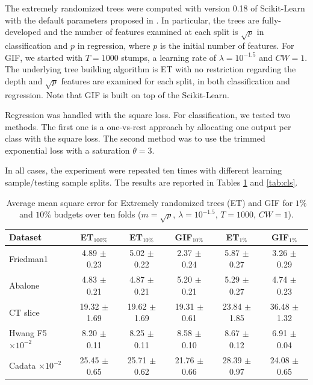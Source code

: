 \documentclass{article}
\newcommand{\bestA}{\cellcolor{orange}}
\newcommand{\bestB}{\cellcolor{dodgerblue}}
\begin{document}
The extremely randomized trees were computed with version 0.18 of Scikit-Learn 
\cite{scikit} with the default parameters proposed in \cite{extratrees}. In 
particular, the trees are fully-developed and the number of features examined 
at each split is $\sqrt{p}$ in classification and $p$ in regression, where $p$ 
is the initial number of features. 
For GIF, we started with $T=1000$ stumps, a learning rate of $\lambda = 
10^{-1.5}$ and $CW=1$. The underlying tree building algorithm is ET with no 
restriction regarding the depth and $\sqrt{p}$ features are examined for each 
split, in both classification and regression.
Note that GIF is built on top of the Scikit-Learn.

Regression was handled with the square loss.
For classification, we tested two methods. The first one is a one-vs-rest 
approach by allocating one output per class with the square loss. The second 
method was to use the trimmed exponential loss with a saturation $\theta = 3$. 

In all cases, the experiment were repeated ten times with different learning 
sample/testing sample splits. The results are reported in Tables \ref{tab:reg} 
and \ref{tab:cls}.

  
\begin{table}[t]
\caption{Average mean square error for Extremely randomized trees (ET) and GIF 
for $1\%$ and $10\%$ budgets over ten folds ($m=\sqrt{p}$, $\lambda=10^{-1.5}$, 
$T=1000$, $CW=1$).}
\label{tab:reg}
\begin{center}
\begin{small}
\begin{sc}
\begin{tabular}{l|c|cc|cc}
\hline
Dataset & ET$_{100\%}$ & ET$_{10\%}$ & GIF$_{10\%}$ & ET$_{1\%}$ & GIF$_{1\%}$\\
\hline
Friedman1 & 4.89 $\pm$ 0.23 & 5.02 $\pm$ 0.22 & \bestA 2.37 $\pm$ 0.24 & 5.87 
$\pm$ 0.27 & \bestB 3.26 $\pm$ 0.29 \\
Abalone & 4.83 $\pm$ 0.21 & \bestA 4.87 $\pm$ 0.21 & 5.20 $\pm$ 0.21 & 5.29 
$\pm$ 0.27 & \bestB 4.74 $\pm$ 0.23 \\
CT slice & 19.32 $\pm$ 1.69 & 19.62 $\pm$ 1.69 & \bestA 19.31 $\pm$ 0.61 & 
\bestB 23.84 $\pm$ 1.85 & 36.48 $\pm$ 1.32 \\
Hwang F5 \hfill {\tiny $\times 10^{-2}$} & 8.20 $\pm$ 0.11 & \bestA 8.25 $\pm$ 
0.11 & 8.58 $\pm$ 0.10 & 8.67 $\pm$ 0.12 & \bestB 6.91 $\pm$ 0.04 \\
Cadata \hfill {\tiny $\times 10^{-2}$} & 25.45 $\pm$ 0.65 & 25.71 $\pm$ 0.62 & 
\bestA 21.76 $\pm$ 0.66 & 28.39 $\pm$ 0.97 & \bestB 24.08 $\pm$ 0.65 \\
\hline
\end{tabular}
\end{sc}
\end{small}
\end{center}
\vskip -0.1in
\end{table}
\end{document}
